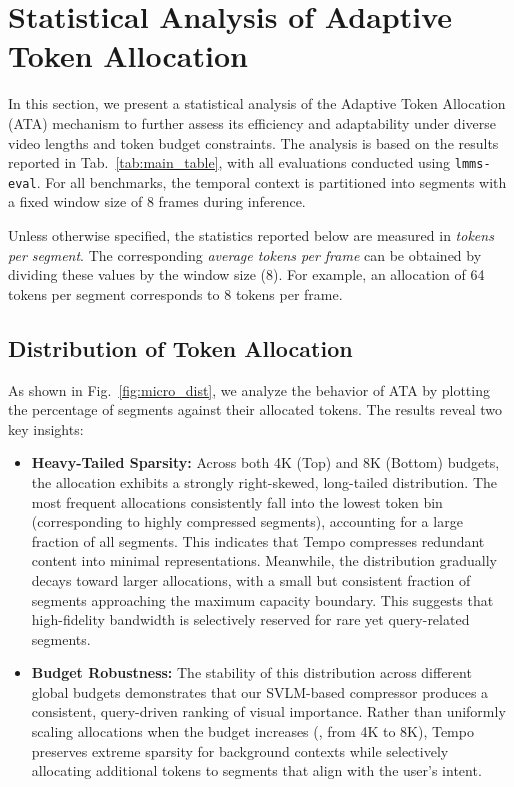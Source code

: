 \section{Statistical Analysis of Adaptive Token Allocation}
\label{supp:ata_stats}

In this section, we present a statistical analysis of the Adaptive Token Allocation (ATA) mechanism to further assess its efficiency and adaptability under diverse video lengths and token budget constraints. The analysis is based on the results reported in Tab.~\ref{tab:main_table}, with all evaluations conducted using \texttt{lmms-eval}. 
%
For all benchmarks, the temporal context is partitioned into segments with a fixed window size of 8 frames during inference.

 Unless otherwise specified, the statistics reported below are measured in \emph{tokens per segment}. The corresponding \emph{average tokens per frame} can be obtained by dividing these values by the window size (8). For example, an allocation of 64 tokens per segment corresponds to 8 tokens per frame.

\subsection{Distribution of Token Allocation}

As shown in Fig.~\ref{fig:micro_dist}, we analyze the behavior of ATA by plotting the percentage of segments against their allocated tokens. The results reveal two key insights:

\begin{itemize}
    \item \textbf{Heavy-Tailed Sparsity:} 
    Across both 4K (Top) and 8K (Bottom) budgets, the allocation exhibits a strongly right-skewed, long-tailed distribution. The most frequent allocations consistently fall into the lowest token bin (corresponding to highly compressed segments), accounting for a large fraction of all segments. This indicates that Tempo compresses redundant content into minimal representations. Meanwhile, the distribution gradually decays toward larger allocations, with a small but consistent fraction of segments approaching the maximum capacity boundary. This suggests that high-fidelity bandwidth is selectively reserved for rare yet query-related segments.
    \item \textbf{Budget Robustness:} 
    The stability of this distribution across different global budgets demonstrates that our SVLM-based compressor produces a consistent, query-driven ranking of visual importance. Rather than uniformly scaling allocations when the budget increases (\eg, from 4K to 8K), Tempo preserves extreme sparsity for background contexts while selectively allocating additional tokens to segments that align with the user's intent.
\end{itemize}

